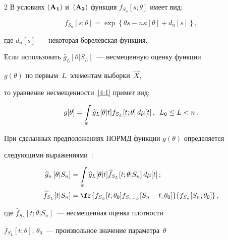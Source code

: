 \begin{multicols}{2}
 В условиях $\bf (A_1)$ и~$\bf(A_2)$ функция $f_{S_n}[s;\theta]$ имеет вид:


  \begin{equation*}


   f_{S_n}[s;\theta]=\exp\left\{\theta s-n\kappa[\theta]+d_n[s]\right\},




  \end{equation*}


 где $d_n[s]$~--- некоторая борелевская функция.





 Если использовать $\widehat{g}_{L}[\theta|S_L]$~--- несмещенную оценку функции


 $g(\theta)$ по первым~$L$~элементам выборки~$\vec{X}$,


 то уравнение несмещенности~\eqref{4:1} примет вид:


   \begin{equation}


  g[\theta]=\int\limits_{\mathbb{R}} \widehat{g}_{L}[\theta|t] f_{S_L}[t;\theta]\, d\mu[t]\,,\enskip   L_0\le L <n\,.


   \label{4:3}


   \end{equation}





 При сделанных предположениях НОРМД функции $g(\theta)$ определяется


 следующими выражениями~\cite{1-ch, 4-ch}:


  \begin{align}


  \widehat{g}_n\left[\theta|S_n\right]&=\int\limits_{\mathbb{R}}


   \widehat{g}_{L}[\theta|t] \widehat{f}_{S_L}[t;\theta|S_n]\, d\mu[t]\,;


   \label{4:4}\\


     \widehat{f}_{S_L}[t|S_n]&=\fr{f_{S_L}[t;\theta_0]


    f_{S_{n-L}}[S_n-t;\theta_0]} {f_{S_n}[S_n;\theta_0]}\,,\notag




  \end{align}


  где $\widehat{f}_{S_L}[t;\theta|S_n]$~--- несмещенная оценка плотности


  $f_{S_L}[t;\theta]$; $\theta_0$~--- произвольное значение параметра~$\theta$



\end{multicols}
